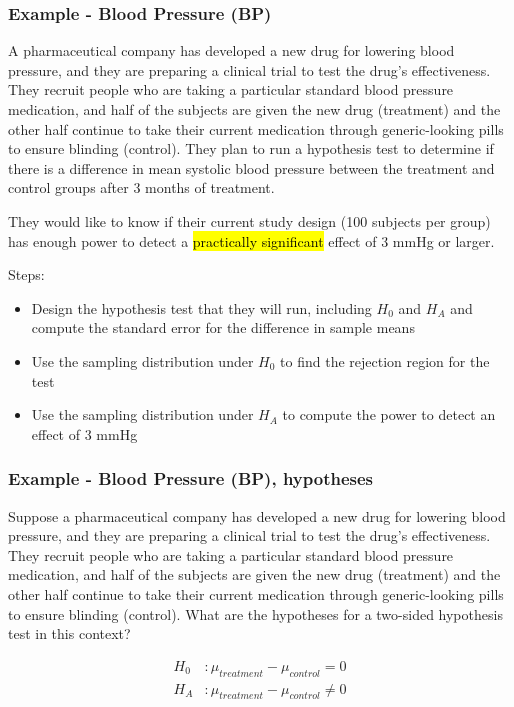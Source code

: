 \documentclass[slidestop,compress,mathserif]{beamer}
\newcommand{\soln}[1]{\textit{#1}}
\begin{document}

\begin{frame}
\frametitle{Example - Blood Pressure (BP)}

{\dq
{\footnotesize
A pharmaceutical company has developed a new drug for lowering blood pressure, and they are preparing a clinical trial to test the drug's effectiveness. They recruit people who are taking a particular standard blood pressure medication, and half of the subjects are given the new drug (treatment) and the other half continue to take their current medication through generic-looking pills to ensure blinding (control). They plan to run a hypothesis test to determine if there is a difference in mean systolic blood pressure between the treatment and control groups after 3 months of treatment. 

They would like to know if their current study design (100 subjects per group) has enough power to detect a \hl{practically significant} effect of 3 mmHg or larger.
}
}

{\footnotesize
Steps:
\begin{itemize}
  \item Design the hypothesis test that they will run, including $H_0$ and $H_A$ and compute the standard error for the difference in sample means
  \item Use the sampling distribution under $H_0$ to find the rejection region for the test
  \item Use the sampling distribution under $H_A$ to compute the power to detect an effect of 3 mmHg
\end{itemize}
}
\end{frame}

\begin{frame}
\frametitle{Example - Blood Pressure (BP), hypotheses}

{\dq
{\footnotesize
Suppose a pharmaceutical company has developed a new drug for lowering blood pressure, and they are preparing a clinical trial to test the drug's effectiveness. They recruit people who are taking a particular standard blood pressure medication, and half of the subjects are given the new drug (treatment) and the other half continue to take their current medication through generic-looking pills to ensure blinding (control). What are the hypotheses for a two-sided hypothesis test in this context?
}
}

\pause

\soln{
\begin{align*}
H_0&: \mu_{treatment} - \mu_{control} = 0 \\
H_A&: \mu_{treatment} - \mu_{control} \ne 0  
\end{align*}
}

\end{frame}
\end{document}
